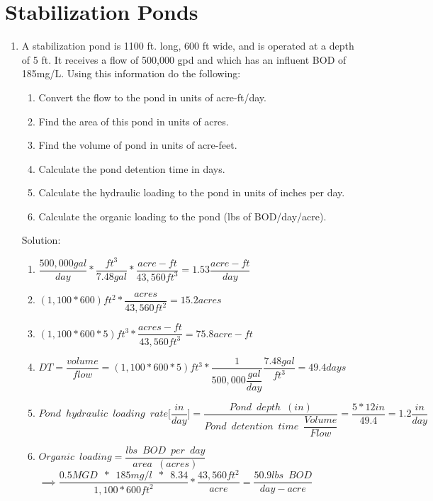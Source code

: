 \section{Stabilization Ponds}
\begin{enumerate}

\item A stabilization pond is 1100 ft. long, 600 ft wide, and is operated at a depth of 5 ft. It receives a flow of 500,000 gpd and which has an influent BOD of 185mg/L.  Using this information do the following:
\begin{enumerate}
\item Convert the flow to the pond in units of acre-ft/day.
\item Find the area of this pond in units of acres.
\item Find the volume of pond in units of acre-feet.
\item Calculate the pond detention time in days.
\item Calculate the hydraulic loading to the pond in units of inches per day.
\item Calculate the organic loading to the pond (lbs of BOD/day/acre).
\end{enumerate}


Solution:\\
\begin{enumerate}
\item $\dfrac{500,000gal}{day}*\dfrac{ft^3}{7.48gal}*\dfrac{acre-ft}{43,560ft^3}=\boxed{1.53\dfrac{acre-ft}{day}}$
\item $(1,100*600)ft^2*\dfrac{acres}{43,560 ft^2}=\boxed{15.2acres}$
\item $(1,100*600*5)ft^3*\dfrac{acres-ft}{43,560 ft^3}=\boxed{75.8 acre-ft}$
\item $DT=\dfrac{volume}{flow}=(1,100*600*5)ft^3*\dfrac{1}{500,000\dfrac{gal}{day}}\dfrac{7.48gal}{ft^3}=\boxed{49.4days}$
\item $Pond \enspace hydraulic \enspace loading \enspace rate \Bigg[\dfrac{in}{day}\Bigg]=\dfrac{Pond \enspace depth \enspace (in)}{Pond \enspace detention  \enspace time \enspace \dfrac{Volume}{Flow}}=\dfrac{5*12in}{49.4}=\boxed{1.2\dfrac{in}{day}}$ \\
\item $Organic \enspace loading=\dfrac{lbs \enspace BOD \enspace per \enspace day}{area \enspace (acres)}$\\
$\implies \dfrac{0.5MGD \enspace * \enspace 185mg/l \enspace * \enspace 8.34}{1,100*600ft^2}*\dfrac{43,560ft^2}{acre}=\boxed{\dfrac{50.9lbs \enspace BOD}{day-acre}}$
\end{enumerate}


\end{enumerate}
